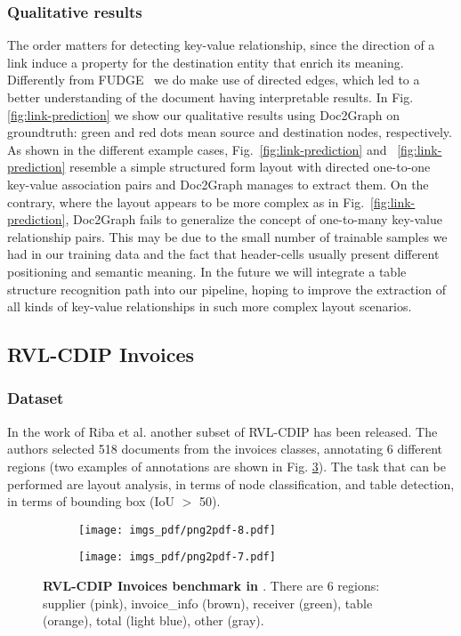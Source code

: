 \documentclass[runningheads]{llncs}
\begin{document}
\subsubsection{Qualitative results}
The order matters for detecting key-value relationship, since the direction of a link induce a property for the destination entity that enrich its meaning. Differently from FUDGE~\cite{davis2021visual} we do make use of directed edges, which led to a better understanding of the document having interpretable results. In Fig. \ref{fig:link-prediction} we show our qualitative results using Doc2Graph on groundtruth: green and red dots mean source and destination nodes, respectively. As shown in the different example cases, Fig.~\ref{fig:link-prediction} and ~\ref{fig:link-prediction} resemble a simple structured form layout with directed one-to-one key-value association pairs and Doc2Graph manages to extract them. On the contrary, where the layout appears to be more complex as in Fig.~\ref{fig:link-prediction}, Doc2Graph fails to generalize the concept of one-to-many key-value relationship pairs. This may be due to the small number of trainable samples we had in our training data and the fact that header-cells usually present different positioning and semantic meaning. In the future we will integrate a table structure recognition path into our pipeline, hoping to improve the extraction of all kinds of key-value relationships in such more complex layout scenarios.

\subsection{RVL-CDIP Invoices}
\subsubsection{Dataset} In the work of Riba et al. \cite{riba2019table} another subset of RVL-CDIP has been released. The authors selected 518 documents from the invoices classes, annotating 6 different regions (two examples of annotations are shown in Fig. \ref{fig:invoices}). The task that can be performed are layout analysis, in terms of node classification, and table detection, in terms of bounding box (IoU $>$ 50). 

\begin{figure}
     \centering
     \begin{subfigure}[b]{0.4\textwidth}
         \centering
         \texttt{[image: imgs\_pdf/png2pdf-8.pdf]}
         \label{fig:pa}
     \end{subfigure}
     \begin{subfigure}[b]{0.4\textwidth}
         \centering
         \texttt{[image: imgs\_pdf/png2pdf-7.pdf]}
         \label{fig:three sin x}
     \end{subfigure}
     \caption{\textbf{RVL-CDIP Invoices benchmark in \cite{riba2019table}}. There are 6 regions: supplier (pink), invoice\_info (brown), receiver (green), table (orange), total (light blue), other (gray).}
     \label{fig:invoices}
\end{figure}
\end{document}
